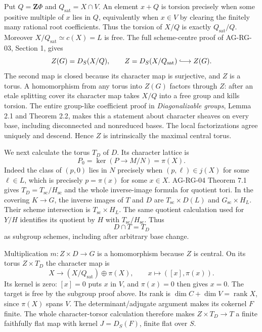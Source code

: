 \documentclass[11pt,a4paper,openany]{report}
\begin{document}
Put \(Q=\mathbf Z\Phi\) and \(Q_{\mathrm{sat}}=X\cap V\). An element \(x+Q\) is torsion precisely when some positive multiple of \(x\) lies in \(Q\), equivalently when \(x\in V\) by clearing the finitely many rational root coefficients. Thus the torsion of \(X/Q\) is exactly \(Q_{\mathrm{sat}}/Q\). Moreover \(X/Q_{\mathrm{sat}}\simeq c(X)=L\) is free. The full scheme-centre proof of AG-RG-03, Section 1, gives \[
 Z(G)=D_S(X/Q),\qquad
 Z=D_S(X/Q_{\mathrm{sat}})\lhook\joinrel\longrightarrow Z(G).
\] The second map is closed because its character map is surjective, and \(Z\) is a torus. A homomorphism from any torus into \(Z(G)\) factors through \(Z\): after an etale splitting cover its character map takes \(X/Q\) into a free group and kills torsion. The entire group-like coefficient proof in \emph{Diagonalizable groups}, Lemma 2.1 and Theorem 2.2, makes this a statement about character sheaves on every base, including disconnected and nonreduced bases. The local factorizations agree uniquely and descend. Hence \(Z\) is intrinsically the maximal central torus.

We next calculate the torus \(T_D\) of \(D\). Its character lattice is \[
 P_0=\ker(P\longrightarrow M/N)=\pi(X).
\] Indeed the class of \((p,0)\) lies in \(N\) precisely when \((p,\ell)\in j(X)\) for some \(\ell\in L\), which is precisely \(p=\pi(x)\) for some \(x\in X\). AG-RG-04 Theorem 7.1 gives \(T_D=T_{\mathrm{sc}}/H_{\mathrm{sc}}\) and the whole inverse-image formula for quotient tori. In the covering \(K\to G\), the inverse images of \(T\) and \(D\) are \(T_{\mathrm{sc}}\times D(L)\) and \(G_{\mathrm{sc}}\times H_L\). Their scheme intersection is \(T_{\mathrm{sc}}\times H_L\). The same quotient calculation used for \(Y/H\) identifies its quotient by \(H\) with \(T_{\mathrm{sc}}/H_{\mathrm{sc}}\). Thus \[
 D\cap T=T_D
\] as subgroup schemes, including after arbitrary base change.

Multiplication \(m:Z\times D\to G\) is a homomorphism because \(Z\) is central. On its torus \(Z\times T_D\) the character map is \[
 X\longrightarrow (X/Q_{\mathrm{sat}})\oplus\pi(X),\qquad
 x\longmapsto([x],\pi(x)).
\] Its kernel is zero: \([x]=0\) puts \(x\) in \(V\), and \(\pi(x)=0\) then gives \(x=0\). The target is free by the subgroup proof above. Its rank is \(\dim C+\dim V=\operatorname{rank}X\), since \(\pi(X)\) spans \(V\). The determinant/adjugate argument makes its cokernel \(F\) finite. The whole character-torsor calculation therefore makes \(Z\times T_D\to T\) a finite faithfully flat map with kernel \(J=D_S(F)\), finite flat over \(S\).
\end{document}
